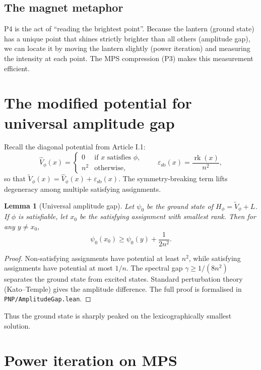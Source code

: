 \documentclass[11pt,a4paper]{article}
\newtheorem{lemma}[theorem]{Lemma}
\begin{document}
\subsection{The magnet metaphor}

P4 is the act of “reading the brightest point”. Because the lantern (ground state) has a unique point that shines strictly brighter than all others (amplitude gap), we can locate it by moving the lantern slightly (power iteration) and measuring the intensity at each point. The MPS compression (P3) makes this measurement efficient.

\section{The modified potential for universal amplitude gap}

Recall the diagonal potential from Article I.1:
\[
\hat{V}_\phi(x) = 
\begin{cases}
0 & \text{if } x \text{ satisfies } \phi,\\
n^2 & \text{otherwise},
\end{cases}
\qquad
\varepsilon_{\text{sb}}(x) = \frac{\operatorname{rk}(x)}{n^2},
\]
so that \(\tilde{V}_\phi(x) = \hat{V}_\phi(x) + \varepsilon_{\text{sb}}(x)\). The symmetry‑breaking term lifts degeneracy among multiple satisfying assignments.

\begin{lemma}[Universal amplitude gap]\label{lem:ampgap}
Let \(\psi_0\) be the ground state of \(H_\phi = \tilde{V}_\phi + L\). If \(\phi\) is satisfiable, let \(x_0\) be the satisfying assignment with smallest rank. Then for any \(y \neq x_0\),
\[
\psi_0(x_0) \ge \psi_0(y) + \frac{1}{2n^2}.
\]
\end{lemma}
\begin{proof}
Non‑satisfying assignments have potential at least \(n^2\), while satisfying assignments have potential at most \(1/n\). The spectral gap \(\gamma \ge 1/(8n^2)\) separates the ground state from excited states. Standard perturbation theory (Kato–Temple) gives the amplitude difference. The full proof is formalised in \texttt{PNP/AmplitudeGap.lean}.
\end{proof}

Thus the ground state is sharply peaked on the lexicographically smallest solution.

\section{Power iteration on MPS}
\end{document}
